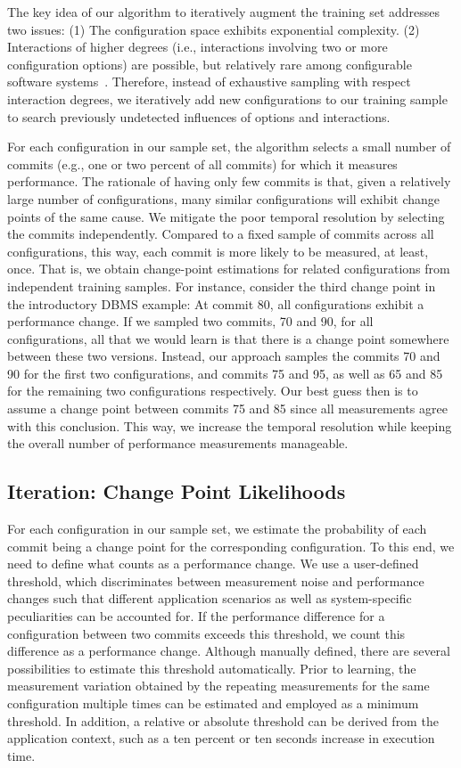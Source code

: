 \documentclass[sigconf, screen]{acmart}
\begin{document}
	The key idea of our algorithm to iteratively augment the training set addresses two issues: (1) The configuration space exhibits exponential complexity. 
	(2) Interactions of higher degrees (i.e., interactions involving two or more configuration options) are possible, but relatively rare among configurable software systems~\cite{kolesnikov_relation_2019,kolesnikov_tradeoffs_2019}. Therefore, instead of exhaustive sampling with respect interaction degrees, we iteratively add new configurations to our training sample to search previously undetected influences of options and interactions.
	
	For each configuration in our sample set, the algorithm selects a small number of commits (e.g., one or two percent of all commits) for which it measures performance. 
	The rationale of having only few commits is that, given a relatively large number of configurations, many similar configurations will exhibit change points of the same cause. 
	We mitigate the poor temporal resolution by selecting the commits independently. 
	Compared to a fixed sample of commits across all configurations, this way, each commit is more likely to be measured, at least, once. That is, we obtain change-point estimations for related configurations from independent training samples. 
	For instance, consider the third change point in the introductory DBMS example: 
	At commit 80, all configurations exhibit a performance change. If we sampled two commits, 70 and 90, for all configurations, all that we would learn is that there is a change point somewhere between these two versions. 
	Instead, our approach samples the commits 70 and 90 for the first two configurations, and commits 75 and 95, as well as 65 and 85 for the remaining two configurations respectively. 
	Our best guess then is to assume a change point between commits 75 and 85 since all measurements agree with this conclusion. 
	This way, we increase the temporal resolution while keeping the overall number of performance measurements manageable.
	
	\subsection{Iteration: Change Point Likelihoods}\label{sec:changepointlikelihood}
	For each configuration in our sample set, we estimate the probability of each commit being a change point for the corresponding configuration.
	To this end, we need to define what counts as a performance change. We use a user-defined threshold, which discriminates between measurement noise and performance changes such that different application scenarios as well as system-specific peculiarities can be accounted for.
	If the performance difference for a configuration between two commits exceeds this threshold, we count this difference  as a performance change.
	Although manually defined, there are several possibilities to estimate this threshold automatically.
	Prior to learning, the measurement variation obtained by the repeating measurements for the same configuration multiple times can be estimated and employed as a minimum threshold.
	In addition, a relative or absolute threshold can be derived from the application context, such as a ten percent or ten seconds increase in execution time.
	
\end{document}
